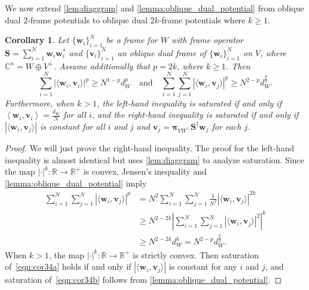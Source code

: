 \documentclass{amsart}
\numberwithin{equation}{section}
\newcommand{\bpi}{{\boldsymbol{\pi}}}
\newcommand{\bw}{{\mathbf w}}
\newcommand{\bv}{{\mathbf v}}
\newcommand{\ip}[2]{\left\langle#1,#2\right\rangle}
\theoremstyle{plain}
\newtheorem{corollary}[theorem]{Corollary}
\theoremstyle{remark}
\theoremstyle{definition}
\begin{document}
We now extend \cref{lem:diaggram} and \cref{lemma:oblique_dual_potential} from oblique dual $2$-frame potentials to oblique dual $2k$-frame potentials where $k \geq 1$.
\begin{corollary}\label{coro:p_Potential_No_Condition}
Let $\{\mathbf{w}_i\}_{i=1}^N$ be a frame for $W$ with frame operator $ \mathbf{S} = \sum_{i=1}^N \mathbf{w}_i\mathbf{w}_i^*$ and $\{\mathbf{v}_i\}_{i=1}^N$ an oblique dual frame of $\{\mathbf{w}_i\}_{i=1}^N$ on $V$, where $\mathbb{C}^n = W \oplus V^\perp$.
Assume additionally that $p=2k$, where $k \geq 1$. Then 
    \begin{equation*}
        \sum_{i=1}^N  |\langle \mathbf{w}_i, \mathbf{v}_i \rangle |^p \geq  N^{1-p}d_W^p \quad \textrm{and} \quad \sum_{i=1}^N \sum_{j=1}^N |\langle \mathbf{w}_i, \mathbf{v}_j \rangle |^p \geq  N^{2-p}d_W^{\frac{p}{2}}.
    \end{equation*}
Furthermore, when $k > 1$, the left-hand inequality is saturated if and only if  $\ip{\bw_i}{\bv_i}=\frac{d_W}{N}$ for all $i$, and the right-hand inequality is saturated if and only if $|\langle \mathbf{w}_i, \mathbf{v}_j \rangle |$ is constant for all $i$ and $j$ and  $\mathbf{v}_j = \bpi_{VW^\perp} \mathbf{S}^\dagger \mathbf{w}_j$ for each $j$.
\end{corollary}
\begin{proof}
We will just prove the right-hand inequality.  The proof for the left-hand inequality is almost identical but uses \cref{lem:diaggram} to analyze saturation. Since the map $|\cdot|^k: \mathbb{R} \rightarrow \mathbb{R}^+$ is convex,  Jensen's inequality and \cref{lemma:oblique_dual_potential} imply
\begin{align}
    \sum_{i=1}^N \sum_{j=1}^N |\langle \mathbf{w}_i, \mathbf{v}_j \rangle |^p &= N^2\sum_{i=1}^N \sum_{j=1}^N \frac{1}{N^2} |\langle \mathbf{w}_i, \mathbf{v}_j \rangle |^{2k}\nonumber\\
    &\geq  N^{2-2k}\left|\sum_{i=1}^N \sum_{j=1}^N |\langle \mathbf{w}_i, \mathbf{v}_j \rangle |^2 \right|^k\label{eqn:cor34a} \\
    &\geq  N^{2-2k}d_W^{k} = N^{2-p}d_W^{\frac{p}{2}}.\label{eqn:cor34b} 
\end{align}
When $k> 1$, the map $|\cdot|^k: \mathbb{R} \rightarrow \mathbb{R}^+$ is strictly convex. Then saturation of~\eqref{eqn:cor34a}  holds if and only if $|\langle \mathbf{w}_i, \mathbf{v}_j \rangle |$ is constant for any $i$ and $j$, and saturation of~\eqref{eqn:cor34b} follows from \cref{lemma:oblique_dual_potential}. 
\end{proof}
\end{document}
